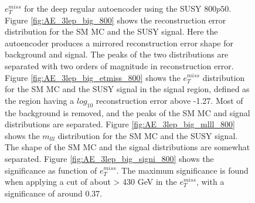 \begin{figure}[!htb]
{    $e_T^{miss}$ for the deep regular autoencoder using the SUSY $800p50$. 
    Figure \ref{fig:AE_3lep_big_800} shows the reconstruction error 
    distribution for the SM MC and the SUSY signal. Here the autoencoder produces a mirrored reconstruction error shape for background and 
    signal. The peaks of the two distributions are separated with two orders of magnitude in reconstruction error. Figure \ref{fig:AE_3lep_big_etmiss_800} 
    shows the $e_T^{miss}$ distribution for the SM MC and the SUSY signal in the signal region, defined as the region 
    having a $log_{10}$ reconstruction error above -1.27. Most of the background is removed, and the peaks of the SM MC and signal 
    distributions are separated. Figure \ref{fig:AE_3lep_big_mlll_800} shows the $m_{lll}$ distribution for the SM MC and the SUSY signal. 
    The shape of the SM MC and the signal distributions are somewhat separated. Figure \ref{fig:AE_3lep_big_signi_800} shows the significance as function of
    $e_T^{miss}$. The maximum significance is found when applying a cut of about > 430 GeV in the $e_T^{miss}$, with a significance of around $0.37$.}
    \label{fig:AE_3lep_big_rec_sig_signi_800}
\end{figure}

